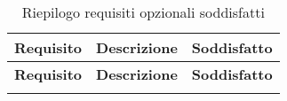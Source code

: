 \def\arraystretch{1.5}
\begin{longtable}{p{2cm}!{\VRule[1pt]}p{6cm}!{\VRule[1pt]}p{2cm}!{\VRule[1pt]}}
\color{white} \textbf{Requisito} & \color{white} \textbf{Descrizione} & \color{white} \textbf{Soddisfatto} \\ 
\endfirsthead 
{} 
\color{white} \textbf{Requisito} & \color{white} \textbf{Descrizione} & \color{white} \textbf{Soddisfatto} \\ 
\endhead 
{}
\caption{Riepilogo requisiti opzionali soddisfatti}
\end{longtable}
